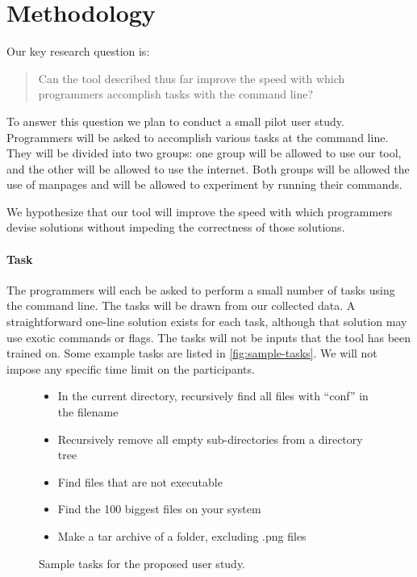 \section{Methodology}

Our key research question is:
%
\begin{quote}
    Can the tool described thus far improve the speed with which programmers
    accomplish tasks with the command line?
\end{quote}
%
To answer this question we plan to conduct a small pilot user study. Programmers
will be asked to accomplish various tasks at the command line. They will be
divided into two groups: one group will be allowed to use our tool, and the
other will be allowed to use the internet. Both groups will be allowed the use
of manpages and will be allowed to experiment by running their commands.

We hypothesize that our tool will improve the speed with which programmers
devise solutions without impeding the correctness of those solutions.

\paragraph{Task} The programmers will each be asked to perform a small number of
tasks using the command line. The tasks will be drawn from our collected data.
A straightforward one-line solution exists for each task, although that solution
may use exotic commands or flags. The tasks will not be inputs that the tool has
been trained on. Some example tasks are listed in \autoref{fig:sample-tasks}. We
will not impose any specific time limit on the participants.

\begin{figure}
    \begin{framed}
    \begin{itemize}
        \item In the current directory, recursively find all files with ``conf''
            in the filename
        \item Recursively remove all empty sub-directories from a directory tree
        \item Find files that are not executable
        \item Find the 100 biggest files on your system
        \item Make a tar archive of a folder, excluding .png files
    \end{itemize}
    \end{framed}
    \caption{Sample tasks for the proposed user study.}
    \label{fig:sample-tasks}
\end{figure}

